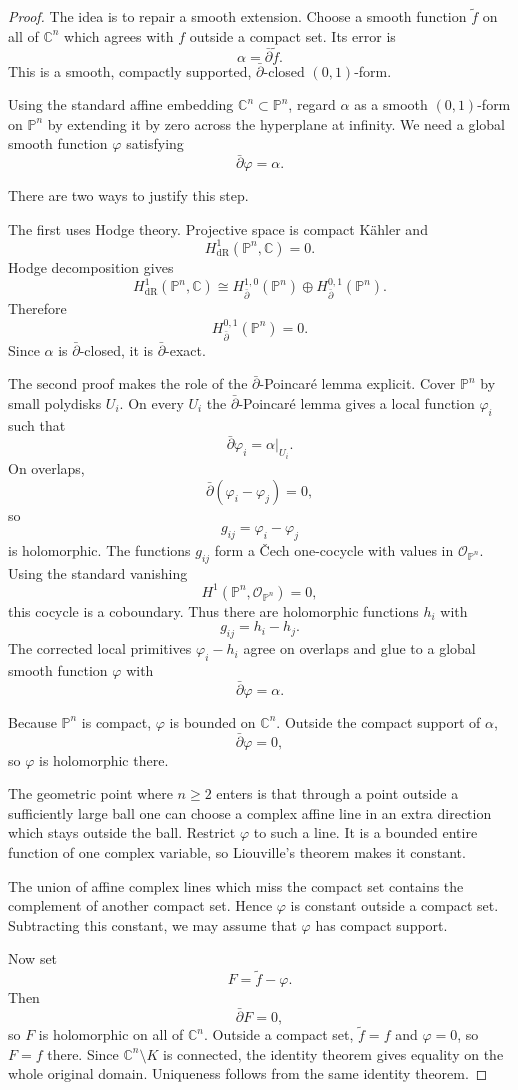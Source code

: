 \begin{proof}
The idea is to repair a smooth extension.
Choose a smooth function
$\widetilde f$ on all of $\mathbb C^n$
which agrees with $f$ outside a compact set.
Its error is
$$
\alpha=\bar\partial\widetilde f.
$$
This is a smooth, compactly supported,
$\bar\partial$-closed $(0,1)$-form.

Using the standard affine embedding
$\mathbb C^n\subset\mathbb P^n$, regard
$\alpha$ as a smooth $(0,1)$-form on
$\mathbb P^n$ by extending it by zero across
the hyperplane at infinity. We need a global
smooth function $\varphi$ satisfying
$$
\bar\partial\varphi=\alpha.
$$

There are two ways to justify this step.

The first uses Hodge theory. Projective space
is compact Kähler and
$$
H^1_{\mathrm{dR}}
(\mathbb P^n,\mathbb C)=0.
$$
Hodge decomposition gives
$$
H^1_{\mathrm{dR}}
(\mathbb P^n,\mathbb C)
\cong
H^{1,0}_{\bar\partial}(\mathbb P^n)
\oplus
H^{0,1}_{\bar\partial}(\mathbb P^n).
$$
Therefore
$$
H^{0,1}_{\bar\partial}(\mathbb P^n)=0.
$$
Since $\alpha$ is
$\bar\partial$-closed, it is
$\bar\partial$-exact.

The second proof makes the role of the
$\bar\partial$-Poincaré lemma explicit.
Cover $\mathbb P^n$ by small polydisks
$U_i$. On every $U_i$ the
$\bar\partial$-Poincaré lemma gives a local
function $\varphi_i$ such that
$$
\bar\partial\varphi_i=\alpha|_{U_i}.
$$
On overlaps,
$$
\bar\partial(\varphi_i-\varphi_j)=0,
$$
so
$$
g_{ij}=\varphi_i-\varphi_j
$$
is holomorphic. The functions $g_{ij}$ form
a Čech one-cocycle with values in
$\mathcal O_{\mathbb P^n}$. Using the
standard vanishing
$$
H^1(\mathbb P^n,\mathcal O_{\mathbb P^n})
=
0,
$$
this cocycle is a coboundary. Thus there are
holomorphic functions $h_i$ with
$$
g_{ij}=h_i-h_j.
$$
The corrected local primitives
$\varphi_i-h_i$ agree on overlaps and glue
to a global smooth function $\varphi$ with
$$
\bar\partial\varphi=\alpha.
$$

Because $\mathbb P^n$ is compact,
$\varphi$ is bounded on $\mathbb C^n$.
Outside the compact support of $\alpha$,
$$
\bar\partial\varphi=0,
$$
so $\varphi$ is holomorphic there.

The geometric point where $n\geq2$ enters is
that through a point outside a sufficiently
large ball one can choose a complex affine
line in an extra direction which stays
outside the ball. Restrict $\varphi$ to such
a line. It is a bounded entire function of
one complex variable, so Liouville's theorem
makes it constant.

The union of affine complex lines which miss
the compact set contains the complement of
another compact set. Hence $\varphi$ is
constant outside a compact set. Subtracting
this constant, we may assume that $\varphi$
has compact support.

Now set
$$
F=\widetilde f-\varphi.
$$
Then
$$
\bar\partial F=0,
$$
so $F$ is holomorphic on all of
$\mathbb C^n$. Outside a compact set,
$\widetilde f=f$ and $\varphi=0$, so
$F=f$ there. Since
$\mathbb C^n\setminus K$ is connected, the
identity theorem gives equality on the whole
original domain. Uniqueness follows from the
same identity theorem.
\end{proof}

